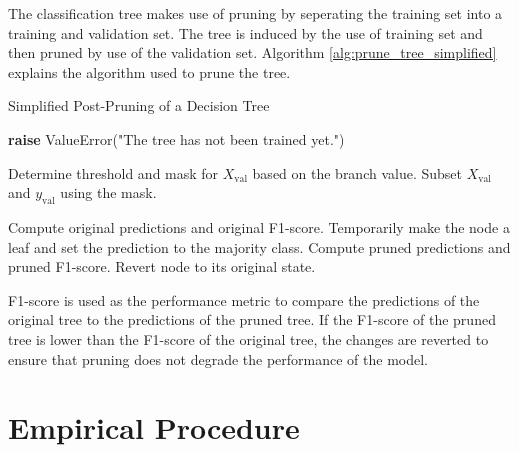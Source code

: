 \documentclass[10pt, conference]{IEEEtran}
\begin{document}
The classification tree makes use of pruning by seperating the training set into a training
and validation set. The tree is induced by the use of training set and then pruned by use of the
validation set. Algorithm \ref{alg:prune_tree_simplified} explains the algorithm used to 
prune the tree. 
\begin{algorithm}[H]
    \caption{Simplified Post-Pruning of a Decision Tree}
    \label{alg:prune_tree_simplified}
    \begin{algorithmic}[1]
                \State \textbf{raise} ValueError("The tree has not been trained yet.")
            \EndIf
            \State {}
        \EndFunction

                \Return
            \EndIf
            
                \State Determine threshold and mask for $X_{\text{val}}$ based on the branch value.
                \State Subset $X_{\text{val}}$ and $y_{\text{val}}$ using the mask.
                    \State {}
                \EndIf
            \EndFor
            
                \State Compute original predictions and original F1-score.
                \State Temporarily make the node a leaf and set the prediction to the majority class.
                \State Compute pruned predictions and pruned F1-score.
                    \State Revert node to its original state.
                \EndIf
            \EndIf
        \EndFunction
    \end{algorithmic}
\end{algorithm}

F1-score is used as the performance metric to compare the predictions of the original tree to the
predictions of the pruned tree. If the F1-score of the pruned tree is lower than the F1-score
of the original tree, the changes are reverted to ensure that pruning does not degrade the performance
of the model.

\section{Empirical Procedure}
\end{document}
